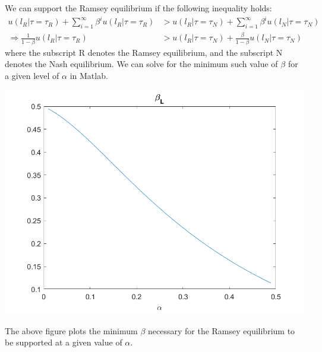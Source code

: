 \documentclass[11pt]{article} %
\begin{document}
We can support the Ramsey equilibrium if the following inequality holds:
\begin{align*}
u(l_R|\tau = \tau_R) + \sum_{i=1}^{\infty} \beta^i u(l_R|\tau=\tau_R)&>u(l_R|\tau = \tau_N) + \sum_{i=1}^{\infty} \beta^i u(l_N|\tau=\tau_N)\\
\Rightarrow \frac{1}{1-\beta}u(l_R|\tau = \tau_R)  &> u(l_R|\tau = \tau_N) + \frac{\beta}{1-\beta}u(l_N|\tau=\tau_N)
\end{align*}
where the subscript R denotes the Ramsey equilibrium, and the subscript N denotes the Nash equilibrium. We can solve for the minimum such value of $\beta$ for a given level of $\alpha$ in Matlab.

\includegraphics{beta}

The above figure plots the minimum $\beta$ necessary for the Ramsey equilibrium to be supported at a given value of $\alpha$.
\end{document}
